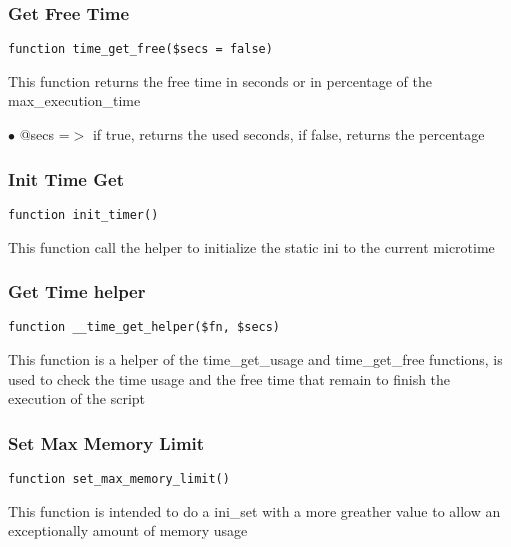 \documentclass[a4paper]{article}
\begin{document}
\hypertarget{toc170}{}
\subsubsection{Get Free Time}

\begin{lstlisting}
function time_get_free($secs = false)
\end{lstlisting}

This function returns the free time in seconds or in percentage of the max\_execution\_time

\begin{compactitem}
\item[\color{myblue}$\bullet$] @secs =$>$ if true, returns the used seconds, if false, returns the percentage
\end{compactitem}

\hypertarget{toc171}{}
\subsubsection{Init Time Get}

\begin{lstlisting}
function init_timer()
\end{lstlisting}

This function call the helper to initialize the static ini to the current microtime

\hypertarget{toc172}{}
\subsubsection{Get Time helper}

\begin{lstlisting}
function __time_get_helper($fn, $secs)
\end{lstlisting}

This function is a helper of the time\_get\_usage and time\_get\_free functions, is used to
check the time usage and the free time that remain to finish the execution of the script

\hypertarget{toc173}{}
\subsubsection{Set Max Memory Limit}

\begin{lstlisting}
function set_max_memory_limit()
\end{lstlisting}

This function is intended to do a ini\_set with a more greather value to allow an
exceptionally amount of memory usage
\end{document}
